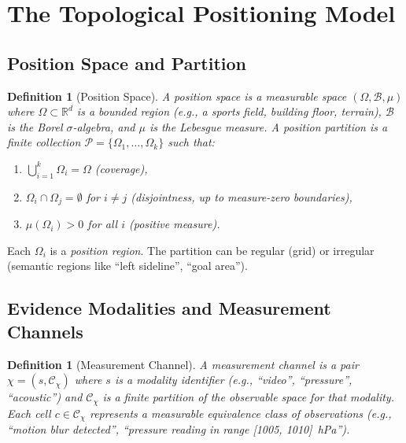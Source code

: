 \documentclass[twocolumn,10pt]{article}
\newtheorem{definition}[theorem]{Definition}
\newcommand{\calC}{\mathcal{C}}     %
\newcommand{\calP}{\mathcal{P}}     %
\begin{document}
\section{The Topological Positioning Model}
\label{sec:model}

\subsection{Position Space and Partition}

\begin{definition}[Position Space]
\label{def:posspace}
A \emph{position space} is a measurable space $(\Omega, \mathcal{B}, \mu)$
where $\Omega \subset \mathbb{R}^d$ is a bounded region (e.g., a sports field,
building floor, terrain), $\mathcal{B}$ is the Borel $\sigma$-algebra, and
$\mu$ is the Lebesgue measure. A \emph{position partition} is a finite
collection $\calP = \{\Omega_1, \ldots, \Omega_k\}$ such that:
\begin{enumerate}[leftmargin=1.5em,topsep=2pt,itemsep=1pt]
  \item[(i)]   $\bigcup_{i=1}^{k} \Omega_i = \Omega$ (coverage),
  \item[(ii)]  $\Omega_i \cap \Omega_j = \emptyset$ for $i \neq j$
    (disjointness, up to measure-zero boundaries),
  \item[(iii)] $\mu(\Omega_i) > 0$ for all $i$ (positive measure).
\end{enumerate}
\end{definition}

Each $\Omega_i$ is a \emph{position region}. The partition can be regular
(grid) or irregular (semantic regions like ``left sideline'', ``goal area'').

\subsection{Evidence Modalities and Measurement Channels}

\begin{definition}[Measurement Channel]
\label{def:channel}
A \emph{measurement channel} is a pair $\chi = (s, \calC_\chi)$ where $s$ is
a modality identifier (e.g., ``video'', ``pressure'', ``acoustic'') and
$\calC_\chi$ is a finite partition of the observable space for that modality.
Each cell $c \in \calC_\chi$ represents a measurable equivalence class of
observations (e.g., ``motion blur detected'', ``pressure reading in range
[1005, 1010]~hPa'').
\end{definition}
\end{document}

